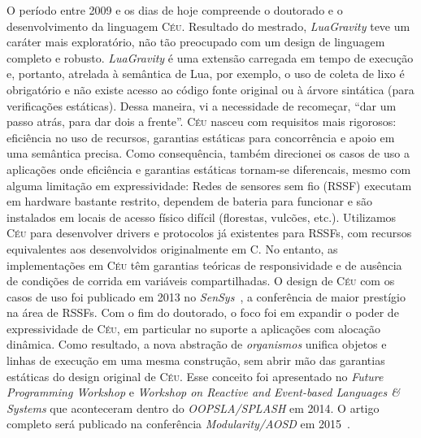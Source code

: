 \documentclass[12pt,a4paper]{article}
\newcommand{\CEU}{\textsc{C\'{e}u}\xspace}
\newcommand{\GVT}{\emph{LuaGravity}\xspace}
\begin{document}
O período entre 2009 e os dias de hoje compreende o doutorado e o 
desenvolvimento da linguagem \CEU.
%
Resultado do mestrado, \GVT teve um caráter mais exploratório, não tão 
preocupado com um design de linguagem completo e robusto.
%
\GVT é uma extensão carregada em tempo de execução e, portanto,
atrelada à semântica de Lua, por exemplo, o uso de coleta de lixo é obrigatório 
e não existe acesso ao código fonte original ou à árvore sintática (para 
verificações estáticas).
%
Dessa maneira, vi a necessidade de recomeçar, ``dar um passo atrás, para dar 
dois a frente''.
%
\CEU nasceu com requisitos mais rigorosos: eficiência no uso de recursos, 
garantias estáticas para concorrência e apoio em uma semântica precisa.
%
Como consequência, também direcionei os casos de uso a aplicações onde
eficiência e garantias estáticas tornam-se diferencais, mesmo com alguma 
limitação em expressividade:
Redes de sensores sem fio (RSSF) executam em hardware bastante restrito, 
dependem de bateria para funcionar e são instalados em locais de acesso físico 
difícil (florestas, vulcões, etc.).
%
Utilizamos \CEU para desenvolver drivers e protocolos já existentes para RSSFs, 
com recursos equivalentes aos desenvolvidos originalmente em C.
No entanto, as implementações em \CEU têm garantias teóricas de responsividade 
e de ausência de condições de corrida em variáveis compartilhadas.
%
O design de \CEU com os casos de uso foi publicado em 2013 no 
\emph{SenSys}~\cite{ceu.sensys13}, a conferência de maior prestígio na área de 
RSSFs.
%
Com o fim do doutorado, o foco foi em expandir o poder de expressividade de 
\CEU, em particular no suporte a aplicações com alocação dinâmica.
Como resultado, a nova abstração de \emph{organismos} unifica objetos e linhas 
de execução em uma mesma construção, sem abrir mão das garantias estáticas do 
design original de \CEU.
%
Esse conceito foi apresentado no \emph{Future Programming Workshop} e 
\emph{Workshop on Reactive and Event-based Languages \& Systems} que 
aconteceram dentro do \emph{OOPSLA/SPLASH} em 2014.
O artigo completo será publicado na conferência \emph{Modularity/AOSD} em 
2015~\cite{ceu.mod15}.
\end{document}
